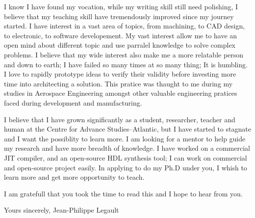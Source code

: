 \documentclass[english,letterpaper]{deedy-resume-openfont}
\begin{document}
{\newpage 
\vspace*{20pt}

I know I have found my vocation, while my writing skill still need polishing, I believe that my teaching skill have tremendously improved since my journey started.
I have interest in a vast area of topics, from machining, to CAD design, to electronic, to software developement.
My vast interest allow me to have an open mind about different topic and use parralel knowledge to solve complex problems.
I believe that my wide interest also make me a more relatable person and down to earth; I have failed so many times at so many thing; It is humbling.
I love to rapidly prototype ideas to verify their validity before investing more time into architecting a solution.
This pratice was thaught to me during my studies in Aerospace Engineering amongst other valuable engineering pratices faced during development and manufacturing.

I believe that I have grown significantly as a student, researcher, teacher and human at the Centre for Advance Studies--Atlantic, but I have started to stagnate and I want the possiblity to learn more.
I am looking for a mentor to help guide my research and have more breadth of knowledge.
I have worked on a commercial JIT compiler, and an open-source HDL synthesis tool; I can work on commercial and open-source project easily.
In applying to do my Ph.D under you, I whish to learn more and get more opportunity to teach.

I am gratefull that you took the time to read this and I hope to hear from you.

\vspace*{20pt}
\RaggedRight

Yours sincerely,
 Jean-Philippe Legault
}
\end{document}
